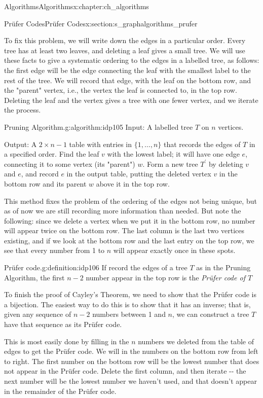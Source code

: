 \documentclass[oneside,10pt,]{book}
\numberwithin{equation}{section}
\begin{document}
\begin{chapterptx}{Algorithms}{}{Algorithms}{}{}{x:chapter:ch_algorithms}
\begin{sectionptx}{Prüfer Codes}{}{Prüfer Codes}{}{}{x:section:s_graphalgorithms_prufer}
\par
To fix this problem, we will write down the edges in a particular order.  Every tree has at least two leaves, and deleting a leaf gives a small tree.  We will use these facts to give a systematic ordering to the edges in a labelled tree, as follows: the first edge will be the edge connecting the leaf with the smallest label to the rest of the tree.  We will record that edge, with the leaf on the bottom row, and the "parent" vertex, i.e., the vertex the leaf is connected to, in the top row.  Deleting the leaf and the vertex gives a tree with one fewer vertex, and we iterate the process.%
\begin{algorithm}{Pruning Algorithm.}{}{g:algorithm:idp105}%
Input:  A labelled tree \(T\) on \(n\) vertices.%
\par
Output: A \(2\times n-1\) table with entries in \(\{1,\dots,n\}\) that records the edges of \(T\) in a specified order.%
Find the leaf \(v\) with the lowest label; it will have one edge \(e\), connecting it to some vertex (its "parent") \(w\).   Form a new tree \(T^\prime\) by deleting \(v\) and \(e\), and record \(e\) in the output table, putting the deleted vertex \(v\) in the bottom row and its parent \(w\) above it in the top row.%
\end{algorithm}
This method fixes the problem of the ordering of the edges not being unique, but as of now we are still recording more information than needed.  But note the following: since we delete a vertex when we put it in the bottom row, no number will appear twice on the bottom row.  The last column is the last two vertices existing, and if we look at the bottom row and the last entry on the top row, we see that every number from 1 to \(n\) will appear exactly once in these spots.%
\begin{definition}{Prüfer code.}{g:definition:idp106}%
If record the edges of a tree \(T\) as in the Pruning Algorithm, the first \(n-2\) number appear in the top row is the \emph{Prüfer code of \(T\)}%
\end{definition}
To finish the proof of Cayley's Theorem, we need to show that the Prüfer code is a bijection.  The easiest way to do this is to show that it has an inverse; that is, given any sequence of \(n-2\) numbers between 1 and \(n\), we can construct a tree \(T\) have that sequence as its Prüfer code.%
\par
This is most easily done by filling in the \(n\) numbers we deleted from the table of edges to get the Prüfer code.  We will in the numbers on the bottom row from left to right.  The first number on the bottom row will be the lowest number that does not appear in the Prüfer code.  Delete the first column, and then iterate -{}-{} the next number will be the lowest number we haven't used, and that doesn't appear in the remainder of the Prüfer code.%

\end{sectionptx}
\end{chapterptx}
\end{document}
